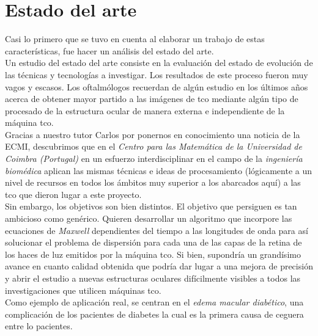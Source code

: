 \chapter{Estado del arte}
Casi lo primero que se tuvo en cuenta al elaborar un trabajo de estas
características, fue hacer un análisis del estado del
arte.\\
Un estudio del estado del arte consiste en la evaluación del estado de
evolución de las técnicas y tecnologías a investigar. Los resultados
de este proceso fueron muy vagos y escasos. Los oftalmólogos recuerdan
de algún estudio en los últimos años acerca de obtener mayor partido a
las imágenes de \gls{tco} mediante algún tipo de procesado de la
estructura ocular de manera externa e independiente de la máquina \gls{tco}.\\
Gracias a nuestro tutor Carlos por ponernos en conocimiento una
noticia de la \gls{ECMI}, descubrimos que en el \emph{Centro para las
  Matemática de la Universidad de Coimbra (Portugal)} en un esfuerzo
interdisciplinar en el campo de la \emph{ingeniería biomédica} aplican
las mismas técnicas e ideas de procesamiento (lógicamente a un nivel
de recursos en todos los ámbitos muy superior a los abarcados aquí) a
las \gls{tco} que dieron lugar a este proyecto. \\
Sin embargo, los objetivos son bien distintos. El objetivo que
persiguen es tan ambicioso como genérico. Quieren desarrollar un
algoritmo que incorpore las ecuaciones de \emph{Maxwell} dependientes
del tiempo a las longitudes de onda para así solucionar el problema de
dispersión para cada una de las capas de la retina de los haces de luz
emitidos por la máquina \gls{tco}. Si bien, supondría un grandísimo
avance en cuanto calidad obtenida que podría dar lugar a una mejora de
precisión y abrir el estudio a nuevas estructuras oculares
difícilmente visibles a todos las investigaciones que utilicen
máquinas \gls{tco}.\\
Como ejemplo de aplicación real, se centran en el \emph{edema macular
  diabético}, una complicación de los pacientes de diabetes la cual es
la primera causa de ceguera entre lo pacientes.
